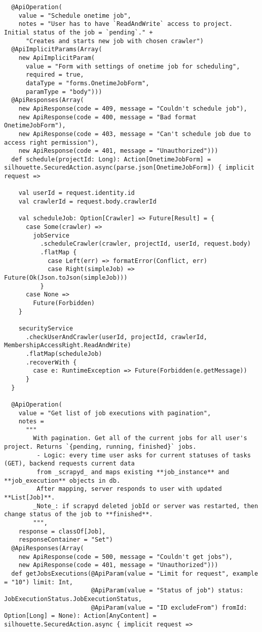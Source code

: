 \begin{lstlisting}
  @ApiOperation(
    value = "Schedule onetime job",
    notes = "User has to have `ReadAndWrite` access to project. Initial status of the job = `pending`." +
      "Creates and starts new job with chosen crawler")
  @ApiImplicitParams(Array(
    new ApiImplicitParam(
      value = "Form with settings of onetime job for scheduling",
      required = true,
      dataType = "forms.OnetimeJobForm",
      paramType = "body")))
  @ApiResponses(Array(
    new ApiResponse(code = 409, message = "Couldn't schedule job"),
    new ApiResponse(code = 400, message = "Bad format OnetimeJobForm"),
    new ApiResponse(code = 403, message = "Can't schedule job due to access right permission"),
    new ApiResponse(code = 401, message = "Unauthorized")))
  def schedule(projectId: Long): Action[OnetimeJobForm] = silhouette.SecuredAction.async(parse.json[OnetimeJobForm]) { implicit request =>

    val userId = request.identity.id
    val crawlerId = request.body.crawlerId

    val scheduleJob: Option[Crawler] => Future[Result] = {
      case Some(crawler) =>
        jobService
          .scheduleCrawler(crawler, projectId, userId, request.body)
          .flatMap {
            case Left(err) => formatError(Conflict, err)
            case Right(simpleJob) => Future(Ok(Json.toJson(simpleJob)))
          }
      case None =>
        Future(Forbidden)
    }

    securityService
      .checkUserAndCrawler(userId, projectId, crawlerId, MembershipAccessRight.ReadAndWrite)
      .flatMap(scheduleJob)
      .recoverWith {
        case e: RuntimeException => Future(Forbidden(e.getMessage))
      }
  }

  @ApiOperation(
    value = "Get list of job executions with pagination",
    notes =
      """
        With pagination. Get all of the current jobs for all user's project. Returns `{pending, running, finished}` jobs.
         - Logic: every time user asks for current statuses of tasks (GET), backend requests current data
         from _scrapyd_ and maps existing **job_instance** and **job_execution** objects in db.
         After mapping, server responds to user with updated **List[Job]**.
        _Note_: if scrapyd deleted jobId or server was restarted, then change status of the job to **finished**.
        """,
    response = classOf[Job],
    responseContainer = "Set")
  @ApiResponses(Array(
    new ApiResponse(code = 500, message = "Couldn't get jobs"),
    new ApiResponse(code = 401, message = "Unauthorized")))
  def getJobsExecutions(@ApiParam(value = "Limit for request", example = "10") limit: Int,
                        @ApiParam(value = "Status of job") status: JobExecutionStatus.JobExecutionStatus,
                        @ApiParam(value = "ID excludeFrom") fromId: Option[Long] = None): Action[AnyContent] = silhouette.SecuredAction.async { implicit request =>


\end{lstlisting}
